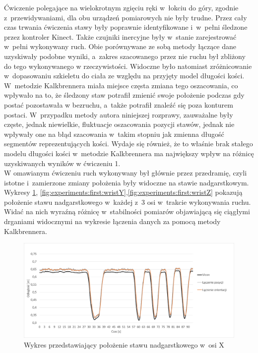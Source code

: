 Ćwiczenie polegające na wielokrotnym zgięciu ręki w~łokciu do góry, zgodnie z~przewidywaniami, dla obu urządzeń pomiarowych nie były trudne. Przez cały czas trwania ćwiczenia stawy były poprawnie identyfikowane i~w~pełni śledzone przez kontroler Kinect. Także czujniki inercyjne były w~stanie zarejestrować w~pełni  wykonywany ruch. Obie porównywane ze sobą metody łączące dane uzyskiwały podobne wyniki, a~zakres szacowanego przez nie ruchu był zbliżony do tego wykonywanego w rzeczywistości. Widoczne było natomiast zróżnicowanie w~dopasowaniu szkieletu do ciała ze względu na przyjęty model długości kości. W~metodzie Kalkbrennera miała miejsce częsta zmiana tego oszacowania, co wpływało na to, że śledzony staw potrafił zmienić swoje położenie podczas gdy postać pozostawała w bezruchu, a~także potrafił znaleźć się poza konturem postaci. W~przypadku metody autora niniejszej rozprawy, zauważalne były częste, jednak niewielkie, fluktuacje oszacowania pozycji stawów, jednak nie wpływały one na błąd szacowania w~takim stopniu jak zmienna długość segmentów reprezentujących kości. Wydaje się również, że to właśnie brak stałego modelu długości kości w~metodzie Kalkbrennera ma największy wpływ na różnicę uzyskiwanych wyników w ćwiczeniu 1. \\

W omawianym ćwiczeniu ruch wykonywany był głównie przez przedramię, czyli istotne i~zamierzone zmiany położenia były widoczne na stawie nadgarstkowym. Wykresy \ref{fig:experiments:first:wristX}, \ref{fig:experiments:first:wristY},\ref{fig:experiments:first:wristZ} pokazują położenie stawu nadgarstkowego w~każdej z~3 osi w~trakcie wykonywania ruchu. Widać na nich wyraźną różnicę w~stabilności pomiarów objawiającą się ciągłymi drganiami widocznymi na wykresie łączenia danych za pomocą metody Kalkbrennera.

\begin{figure}[!htb]
	\centering
	\includegraphics[width=0.9\linewidth]{images/100/Slide4.png}
	\caption{Wykres przedstawiający położenie stawu nadgarstkowego w~osi X}
	\label{fig:experiments:first:wristX}
\end{figure}


